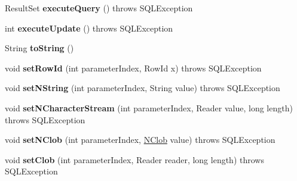 \begin{DoxyCompactItemize}
Result\+Set {\bfseries execute\+Query} ()  throws S\+Q\+L\+Exception 
\item 
\mbox{\label{classcom_1_1mysql_1_1cj_1_1jdbc_1_1_prepared_statement_wrapper_a0c47cb81a429c3495b9d1851e841cbad}} 
int {\bfseries execute\+Update} ()  throws S\+Q\+L\+Exception 
\item 
\mbox{\label{classcom_1_1mysql_1_1cj_1_1jdbc_1_1_prepared_statement_wrapper_ad875cc9579cad123f5a2a60d140ef0f5}} 
String {\bfseries to\+String} ()
\item 
\mbox{\label{classcom_1_1mysql_1_1cj_1_1jdbc_1_1_prepared_statement_wrapper_abd7a3f200e20f1fb2ae57651c14f12f7}} 
void {\bfseries set\+Row\+Id} (int parameter\+Index, Row\+Id x)  throws S\+Q\+L\+Exception 
\item 
\mbox{\label{classcom_1_1mysql_1_1cj_1_1jdbc_1_1_prepared_statement_wrapper_aa93a1e7363dc07e810a65c76f459fd29}} 
void {\bfseries set\+N\+String} (int parameter\+Index, String value)  throws S\+Q\+L\+Exception 
\item 
\mbox{\label{classcom_1_1mysql_1_1cj_1_1jdbc_1_1_prepared_statement_wrapper_aa438998eee938e02b383c9fac429b333}} 
void {\bfseries set\+N\+Character\+Stream} (int parameter\+Index, Reader value, long length)  throws S\+Q\+L\+Exception 
\item 
\mbox{\label{classcom_1_1mysql_1_1cj_1_1jdbc_1_1_prepared_statement_wrapper_ab4a642b4327dbdb112d019dda77582fb}} 
void {\bfseries set\+N\+Clob} (int parameter\+Index, \mbox{\hyperlink{classcom_1_1mysql_1_1cj_1_1jdbc_1_1_n_clob}{N\+Clob}} value)  throws S\+Q\+L\+Exception 
\item 
\mbox{\label{classcom_1_1mysql_1_1cj_1_1jdbc_1_1_prepared_statement_wrapper_ace3a608cba286f1254164b586fe87ec4}} 
void {\bfseries set\+Clob} (int parameter\+Index, Reader reader, long length)  throws S\+Q\+L\+Exception 

\end{DoxyCompactItemize}
